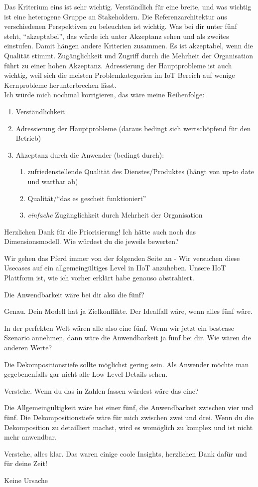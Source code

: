 \PE Das Kriterium eins ist sehr wichtig. Verständlich für eine breite, und was wichtig ist eine heterogene Gruppe an Stakeholdern. Die Referenzarchitektur aus verschiedenen Perspektiven zu beleuchten ist wichtig. Was bei dir unter fünf steht, \enquote{akzeptabel}, das würde ich unter Akzeptanz sehen und als zweites einstufen. Damit hängen andere Kriterien zusammen. Es ist akzeptabel, wenn die Qualität stimmt. Zugänglichkeit und Zugriff durch die Mehrheit der Organisation führt zu einer hohen Akzeptanz. Adressierung der Hauptprobleme ist auch wichtig, weil sich die meisten Problemkategorien im \ac{IoT} Bereich auf wenige Kernprobleme herunterbrechen lässt. \\
Ich würde mich nochmal korrigieren, das wäre meine Reihenfolge:
\begin{enumerate}
    \item Verständlichkeit
    \item Adressierung der Hauptprobleme (daraus bedingt sich wertschöpfend für den Betrieb)
    \item Akzeptanz durch die Anwender (bedingt durch):
    \begin{enumerate}
        \item zufriedenstellende Qualität des Dienstes/Produktes (hängt von up-to date und wartbar ab)
        \item Qualität/\enquote{das es gescheit funktioniert}
        \item \textit{einfache} Zugänglichkeit durch Mehrheit der Organisation
    \end{enumerate}
\end{enumerate}

\LF Herzlichen  Dank für die Priorisierung! Ich hätte auch noch das Dimensionsmodell. Wie würdest du die jeweils bewerten?

\PE Wir gehen das Pferd immer von der folgenden Seite an - Wir versuchen diese Usecases auf ein allgemeingültiges Level in \ac{IIoT} anzuheben. Unsere \ac{IIoT} Plattform ist, wie ich vorher erklärt habe genauso abstrahiert.

\LF Die Anwendbarkeit wäre bei dir also die fünf?

\PE Genau. Dein Modell hat ja Zielkonflikte. Der Idealfall wäre, wenn alles fünf wäre. 

\LF In der perfekten Welt wären alle also eine fünf. Wenn wir jetzt ein bestcase Szenario annehmen, dann wäre die Anwendbarkeit ja fünf bei dir. Wie wären die anderen Werte?

\PE Die Dekompositionstiefe sollte möglichst gering sein. Als Anwender möchte man gegebenenfalls gar nicht alle Low-Level Details sehen.

\LF Verstehe. Wenn du das in Zahlen fassen würdest wäre das eine?

\PE Die Allgemeingültigkeit wäre bei einer fünf, die Anwendbarkeit zwischen vier und fünf. Die Dekompositionstiefe wäre für mich zwischen zwei und drei. Wenn du die Dekomposition zu detailliert machst, wird es womöglich zu komplex und ist nicht mehr anwendbar.

\LF Verstehe, alles klar. Das waren einige coole Insights, herzlichen Dank dafür und für deine Zeit!

\PE Keine Ursache